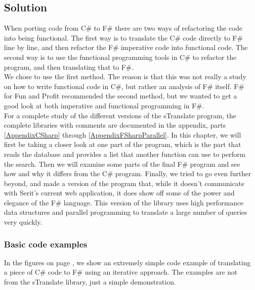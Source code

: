 \documentclass[12pt, a4paper]{article}
\begin{document}
\newpage

\subsection{Solution}
\label{Solution}
When porting code from C\# to F\# there are two ways of refactoring the code into being functional. The first way is to translate the C\# code directly to F\# line by line, and then refactor the F\# imperative code into functional code. The second way is to use the functional programming tools in C\# to refactor the program, and then translating that to F\#.\\

We chose to use the first method. The reason is that this was not really a study on how to write functional code in C\#, but rather an analysis of F\# itself. F\# for Fun and Profit recommended the second method, but we wanted to get a good look at both imperative and functional programming in F\#.\\

For a complete study of the different versions of the sTranslate program, the complete libraries with comments are documented in the appendix, parts \ref{AppendixCSharp} through \ref{AppendixFSharpParallel}. In this chapter, we will first be taking a closer look at one part of the program, which is the part that reads the database and provides a list that another function can use to perform the search. Then we will examine some parts of the final F\# program and see how and why it differs from the C\# program. Finally, we tried to go even further beyond, and made a version of the program that, while it doesn't communicate with Serit's current web application, it does show off some of the power and elegance of the F\# language. This version of the library uses high performance data structures and parallel programming to translate a large number of queries very quickly.

\newpage

\subsubsection{Basic code examples}
In the figures on page \pageref{fig:CSharpIf}, we show an extremely simple code example of translating a piece of C\# code to F\# using an iterative approach. The examples are not from the sTranslate library, just a simple demonstration.\\
\end{document}
